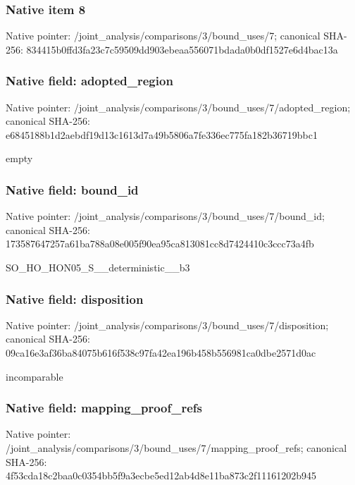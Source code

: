 \documentclass[10pt,a4paper]{article}
\begin{document}
\subsubsection{Native item 8}
Native pointer: /joint\_\allowbreak{}analysis/comparisons/3/bound\_\allowbreak{}uses/7; canonical SHA-256: 834415b0ffd3fa23c7c59509dd903ebeaa556071bdada0b0df1527e6d4bac13a

\subsubsection{Native field: adopted\_\allowbreak{}region}
Native pointer: /joint\_\allowbreak{}analysis/comparisons/3/bound\_\allowbreak{}uses/7/adopted\_\allowbreak{}region; canonical SHA-256: e6845188b1d2aebdf19d13c1613d7a49b5806a7fe336ec775fa182b36719bbc1

\begingroup\raggedright\sloppy empty\par\endgroup

\subsubsection{Native field: bound\_\allowbreak{}id}
Native pointer: /joint\_\allowbreak{}analysis/comparisons/3/bound\_\allowbreak{}uses/7/bound\_\allowbreak{}id; canonical SHA-256: 173587647257a61ba788a08e005f90ea95ca813081cc8d7424410c3ccc73a4fb

\begingroup\raggedright\sloppy SO\_\allowbreak{}HO\_\allowbreak{}HON05\_\allowbreak{}S\_\allowbreak{}\_\allowbreak{}deterministic\_\allowbreak{}\_\allowbreak{}b3\par\endgroup

\subsubsection{Native field: disposition}
Native pointer: /joint\_\allowbreak{}analysis/comparisons/3/bound\_\allowbreak{}uses/7/disposition; canonical SHA-256: 09ca16e3af36ba84075b616f538c97fa42ea196b458b556981ca0dbe2571d0ac

\begingroup\raggedright\sloppy incomparable\par\endgroup

\subsubsection{Native field: mapping\_\allowbreak{}proof\_\allowbreak{}refs}
Native pointer: /joint\_\allowbreak{}analysis/comparisons/3/bound\_\allowbreak{}uses/7/mapping\_\allowbreak{}proof\_\allowbreak{}refs; canonical SHA-256: 4f53cda18c2baa0c0354bb5f9a3ecbe5ed12ab4d8e11ba873c2f11161202b945
\end{document}

